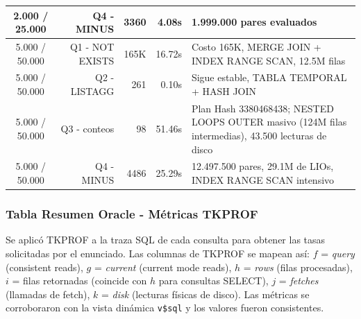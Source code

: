 \documentclass[12pt,a4paper]{article}
\begin{document}
\begin{table}[h]
{\begin{tabular}{|c|r|r|r|l|}
2.000 / 25.000 & Q4 - MINUS & 3360 & 4.08s & 1.999.000 pares evaluados \\ \hline
5.000 / 50.000 & Q1 - NOT EXISTS & 165K & 16.72s & Costo 165K, MERGE JOIN + INDEX RANGE SCAN, 12.5M filas \\ \hline
5.000 / 50.000 & Q2 - LISTAGG & 261 & 0.10s & Sigue estable, TABLA TEMPORAL + HASH JOIN \\ \hline
5.000 / 50.000 & Q3 - conteos & 98 & 51.46s & Plan Hash 3380468438; NESTED LOOPS OUTER masivo (124M filas intermedias), 43.500 lecturas de disco \\ \hline
5.000 / 50.000 & Q4 - MINUS & 4486 & 25.29s & 12.497.500 pares, 29.1M de LIOs, INDEX RANGE SCAN intensivo \\ \hline
\end{tabular}%
}
\end{table}

\subsubsection{Tabla Resumen Oracle - Métricas TKPROF}
Se aplicó TKPROF a la traza SQL de cada consulta para obtener las tasas solicitadas por el enunciado. Las columnas de TKPROF se mapean así: $f$ = \textit{query} (consistent reads), $g$ = \textit{current} (current mode reads), $h$ = \textit{rows} (filas procesadas), $i$ = filas retornadas (coincide con $h$ para consultas SELECT), $j$ = \textit{fetches} (llamadas de fetch), $k$ = \textit{disk} (lecturas físicas de disco). Las métricas se corroboraron con la vista dinámica \texttt{v\$sql} y los valores fueron consistentes.
\end{document}
